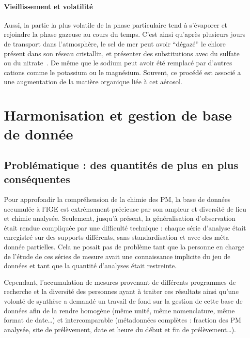 \paragraph{Vieillissement et volatilité}%
\label{par:vieillissement_et_volatilité}

Aussi, la partie la plus volatile de la phase particulaire tend à s'évaporer et rejoindre
la phase gazeuse au cours du temps. C'est ainsi qu'après plusieurs jours de transport
dans l'atmosphère, le sel de mer peut avoir ``dégazé'' le chlore présent dans son réseau
cristallin, et présenter des substitutions avec du sulfate ou du
nitrate~\parencite{chiSea2015}. De même que le
sodium peut avoir été remplacé par d'autres cations comme le potassium ou le magnésium.
Souvent, ce procédé est associé a une augmentation de la matière organique liée à cet
aérosol.


\section{Harmonisation et gestion de base de donnée}%
\label{sec:harmonisation_et_gestion_de_base_de_donnée}

\subsection{Problématique : des quantités de plus en plus conséquentes}%
\label{sub:problématisation_des_quantités_de_plus_en_plus_conséquentes}

Pour approfondir la compréhension de la chimie des PM, la base de données accumulée à l'IGE
est extrêmement précieuse par son ampleur et diversité de lieu et chimie analysée.
Seulement, jusqu'à présent, la généralisation d'observation était rendue compliquée par une
difficulté technique : chaque série d'analyse était enregistré sur des supports différents,
sans standardisation et avec des méta-donnée partielles. Cela ne posait pas de problème
tant que la personne en charge de l'étude de ces séries de mesure avait une connaissance
implicite du jeu de données et tant que la quantité d'analyses était restreinte.

Cependant, l'accumulation de mesures provenant de différents programmes de recherche et la
diversité des personnes ayant à traiter ces résultats ainsi qu'une volonté de synthèse
a demandé un travail de fond sur la gestion de cette base de données afin de la rendre 
homogène (même unité, même nomenclature, même format de date…) et intercomparable
(métadonnées complètes : fraction des PM analysée, site de prélèvement, date et heure du
début et fin de prélèvement…).

